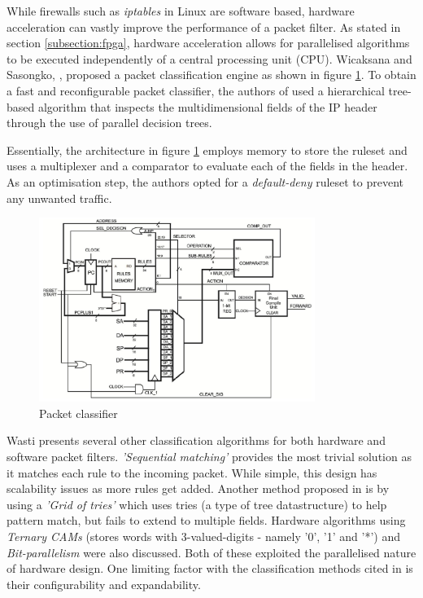While firewalls such as \textit{iptables} in Linux are software based, hardware acceleration can vastly improve the performance of a packet filter. As stated in section 
\ref{subsection:fpga}, hardware acceleration allows for parallelised algorithms to be executed independently of a central processing unit (CPU). Wicaksana and Sasongko, 
\cite{FastRecongifFPGAFirewall}, proposed a packet classification engine as shown in figure \ref{fig:fast-fpga-classifier}. To obtain a fast and reconfigurable packet 
classifier, the authors of \cite{FastRecongifFPGAFirewall} used a hierarchical tree-based algorithm that inspects the multidimensional fields of the IP header through 
the use of parallel decision trees.

Essentially, the architecture in figure \ref{fig:fast-fpga-classifier} employs memory to store the ruleset and uses a multiplexer and a comparator to evaluate each of the fields 
in the header. As an optimisation step, the authors opted for a \textit{default-deny} ruleset to prevent any unwanted traffic. 


\begin{figure}[h]
    \centering
    \includegraphics[width=0.8\textwidth]{Images/packetFilterHardware.png}
    \caption{Packet classifier \cite{FastRecongifFPGAFirewall}}
    \label{fig:fast-fpga-classifier}
\end{figure}


\newpage

Wasti \cite{Wasti2001HardwareAP} presents several other classification algorithms for both hardware and software packet filters. \textit{'Sequential matching'} provides the most 
trivial solution as it matches each rule to the incoming packet. While simple, this design has scalability issues as more rules get added. Another method proposed in 
\cite{Wasti2001HardwareAP} is by using a \textit{'Grid of tries'} which uses tries (a type of tree datastructure) to help pattern match, but fails to extend to multiple fields. 
Hardware algorithms using \textit{Ternary CAMs} (stores words with 3-valued-digits - namely '0', '1' and '*') and \textit{Bit-parallelism} were also discussed. Both of these 
exploited the parallelised nature of hardware design. One limiting factor with the classification methods cited in \cite{Wasti2001HardwareAP} is their configurability and 
expandability. 



